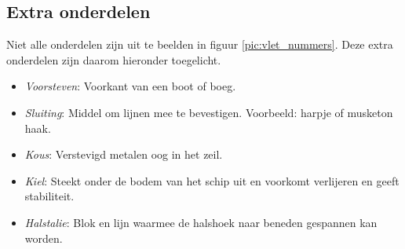 \subsection{Extra onderdelen}
\label{ss:extra}
Niet alle onderdelen zijn uit te beelden in figuur \ref{pic:vlet_nummers}. Deze extra onderdelen zijn daarom hieronder toegelicht.
\vspace*{-0.2cm}
\begin{itemize}
	\item \textit{Voorsteven}: Voorkant van een boot of boeg.
	\item \textit{Sluiting}: Middel om lijnen mee te bevestigen. Voorbeeld: harpje of musketon haak.
	\item \textit{Kous}: Verstevigd metalen oog in het zeil.
	\item \textit{Kiel}: Steekt onder de bodem van het schip uit en voorkomt verlijeren en geeft stabiliteit.
	\item \textit{Halstalie}: Blok en lijn waarmee de halshoek naar beneden gespannen kan worden.
\end{itemize}

\newpage

